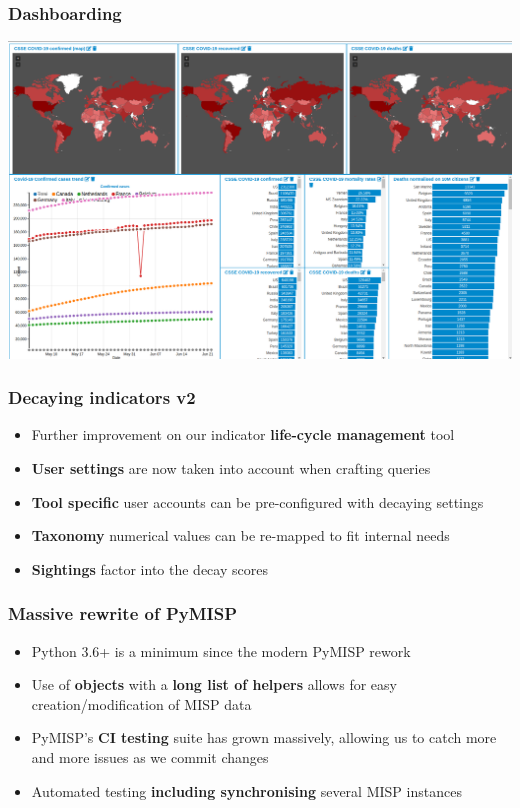\begin{frame}
\frametitle{Dashboarding}
\includegraphics[scale=0.25]{images/dashboard.png}
\end{frame}


\begin{frame}
\frametitle{Decaying indicators v2}
\begin{itemize}
        \item Further improvement on our indicator {\bf life-cycle management} tool
	\item {\bf User settings} are now taken into account when crafting queries
        \item {\bf Tool specific} user accounts can be pre-configured with decaying settings
        \item {\bf Taxonomy} numerical values can be re-mapped to fit internal needs
        \item {\bf Sightings} factor into the decay scores
\end{itemize}
\end{frame}

\begin{frame}
\frametitle{Massive rewrite of PyMISP}
\begin{itemize}
	\item Python 3.6+ is a minimum since the modern PyMISP rework
        \item Use of {\bf objects} with a {\bf long list of helpers} allows for easy creation/modification of MISP data
        \item PyMISP's {\bf CI testing} suite has grown massively, allowing us to catch more and more issues as we commit changes
        \item Automated testing {\bf including synchronising} several MISP instances
\end{itemize}
\end{frame}

